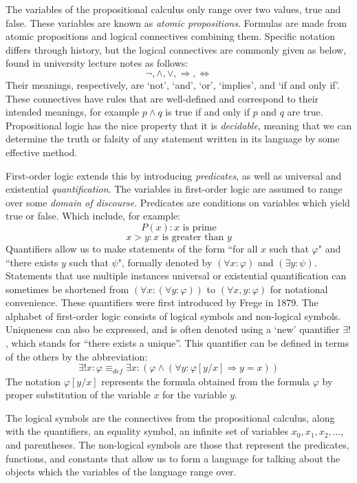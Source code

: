\documentclass[11pt]{report}
\newcommand{\eqdef}{\equiv_\mathit{def}}
\theoremstyle{definition}
\theoremstyle{theorem}
\theoremstyle{lemma}
\begin{document}
The variables of the propositional calculus only range over two values, true and false. 
These variables are known as \emph{atomic propositions}. 
Formulas are made from atomic propositions and logical connectives combining them. 
Specific notation differs through history, but the logical connectives are commonly given as below, found in university lecture notes \cite[p.~2]{beckert} as follows:
$$\neg, \wedge, \vee,\Rightarrow,\Leftrightarrow$$
Their meanings, respectively, are `not', `and', `or', `implies', and `if and only if'. 
These connectives have rules that are well-defined and correspond to their intended meanings, for example $p \wedge q$ is true if and only if $p$ and $q$ are true.  
Propositional logic has the nice property that it is \emph{decidable}, meaning that we can determine the truth or falsity of any statement written in its language by some effective method.

First-order logic extends this by introducing \emph{predicates}, as well as universal and existential \emph{quantification}. 
The variables in first-order logic are assumed to range over some \emph{domain of discourse}.
Predicates are conditions on variables which yield true or false. Which include, for example:  
$$P(x) : x \text{ is prime}$$
$$ x > y : x \text{ is greater than } y$$
Quantifiers allow us to make statements of the form ``for all $x$ such that $\varphi$" and ``there exists $y$ such that $\psi$", formally denoted by $(\forall x:\varphi)$ and $(\exists y:\psi)$. 
Statements that use multiple instances universal or existential quantification can sometimes be shortened from $(\forall x:(\forall y: \varphi))$ to $(\forall x,y: \varphi)$ for notational convenience.
These quantifiers were first introduced by Frege \cite{frege} in 1879.
The alphabet of first-order logic consists of logical symbols and non-logical symbols.
Uniqueness can also be expressed, and is often denoted using a `new' quantifier $\exists!$, which stands for ``there exists a unique''. 
This quantifier can be defined in terms of the others by the abbreviation:
$$\exists!x:\varphi \eqdef \exists x: (\varphi \wedge (\forall y: \varphi[y/x] \Rightarrow y=x))$$
The notation $\varphi[y/x]$ represents the formula obtained from the formula $\varphi$ by proper substitution of the variable $x$ for the variable $y$.

The logical symbols are the connectives from the propositional calculus, along with the quantifiers, an equality symbol, an infinite set of variables $x_0, x_1, x_2,\ldots$, and parentheses.
The non-logical symbols are those that represent the predicates, functions, and constants that allow us to form a language for talking about the objects which the variables of the language range over.
\end{document}
